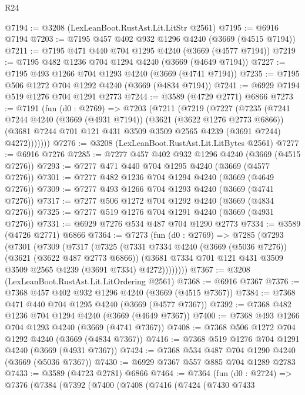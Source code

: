 \begin{lexlean}{R24}
\begin{coremodule}
@7194 := @3208 (LexLeanBoot.RustAst.Lit.LitStr @2561)
@7195 := @6916 @7194
@7203 := @7195 @457 @402 @932 @1296 @4240 (@3669 (@4515 @7194))
@7211 := @7195 @471 @440 @704 @1295 @4240 (@3669 (@4577 @7194))
@7219 := @7195 @482 @1236 @704 @1294 @4240 (@3669 (@4649 @7194))
@7227 := @7195 @493 @1266 @704 @1293 @4240 (@3669 (@4741 @7194))
@7235 := @7195 @506 @1272 @704 @1292 @4240 (@3669 (@4834 @7194))
@7241 := @6929 @7194 @519 @1276 @704 @1291 @2773
@7244 := @3589 (@4729 @2771) @6866
@7273 := @7191
    (fun (d0 : @2769) =>
    @7203
      (@7211
        (@7219
          (@7227
            (@7235
              (@7241
                @7244
                @4240
                (@3669 (@4931 @7194))
                (@3621 (@3622 @1276 @2773 @6866))
                (@3681 @7244 @701 @121 @431 @3509 @3509 @2565 @4239 (@3691 @7244) @4272)))))))
@7276 := @3208 (LexLeanBoot.RustAst.Lit.LitBytes @2561)
@7277 := @6916 @7276
@7285 := @7277 @457 @402 @932 @1296 @4240 (@3669 (@4515 @7276))
@7293 := @7277 @471 @440 @704 @1295 @4240 (@3669 (@4577 @7276))
@7301 := @7277 @482 @1236 @704 @1294 @4240 (@3669 (@4649 @7276))
@7309 := @7277 @493 @1266 @704 @1293 @4240 (@3669 (@4741 @7276))
@7317 := @7277 @506 @1272 @704 @1292 @4240 (@3669 (@4834 @7276))
@7325 := @7277 @519 @1276 @704 @1291 @4240 (@3669 (@4931 @7276))
@7331 := @6929 @7276 @534 @487 @704 @1290 @2773
@7334 := @3589 (@4726 @2771) @6866
@7364 := @7273
    (fun (d0 : @2769) =>
    @7285
      (@7293
        (@7301
          (@7309
            (@7317
              (@7325
                (@7331
                  @7334
                  @4240
                  (@3669 (@5036 @7276))
                  (@3621 (@3622 @487 @2773 @6866))
                  (@3681 @7334 @701 @121 @431 @3509 @3509 @2565 @4239 (@3691 @7334) @4272))))))))
@7367 := @3208 (LexLeanBoot.RustAst.Lit.LitOrdering @2561)
@7368 := @6916 @7367
@7376 := @7368 @457 @402 @932 @1296 @4240 (@3669 (@4515 @7367))
@7384 := @7368 @471 @440 @704 @1295 @4240 (@3669 (@4577 @7367))
@7392 := @7368 @482 @1236 @704 @1294 @4240 (@3669 (@4649 @7367))
@7400 := @7368 @493 @1266 @704 @1293 @4240 (@3669 (@4741 @7367))
@7408 := @7368 @506 @1272 @704 @1292 @4240 (@3669 (@4834 @7367))
@7416 := @7368 @519 @1276 @704 @1291 @4240 (@3669 (@4931 @7367))
@7424 := @7368 @534 @487 @704 @1290 @4240 (@3669 (@5036 @7367))
@7430 := @6929 @7367 @557 @885 @704 @1289 @2783
@7433 := @3589 (@4723 @2781) @6866
@7464 := @7364
    (fun (d0 : @2724) =>
    @7376
      (@7384
        (@7392
          (@7400
            (@7408
              (@7416
                (@7424
                  (@7430
                    @7433

\end{coremodule}
\end{lexlean}
